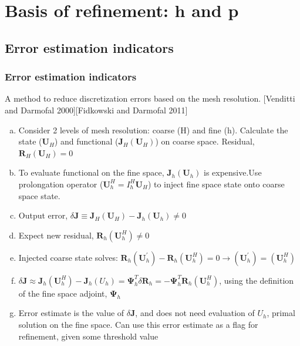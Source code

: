 \documentclass{beamer}
\begin{document}
\section[$\Psi$ with h]{Basis of refinement: h and p}

\subsection[Estimation]{Error estimation indicators}
\begin{frame}
\scriptsize
\frametitle{Error estimation indicators}

A method to reduce discretization errors based on the mesh resolution.
\tiny{[Venditti and Darmofal 2000][Fidkowski and Darmofal 2011]}
\begin{enumerate}[(a)]
\scriptsize
\item Consider 2 levels of mesh resolution: coarse (H) and fine (h). Calculate the state ($\mathbf{U}_H$) and functional ($\mathbf{J}_H(\mathbf{U}_H)$) on coarse space. Residual, $\mathbf{R}_H(\mathbf{U}_H) = 0$
\item To evaluate functional on the fine space, $\mathbf{J}_h(\mathbf{U}_h)$ is expensive.Use prolongation operator ($\mathbf{U}_h^H = I_h^H \mathbf{U}_H$) to inject fine space state onto coarse space state.
\item Output error, $\delta \mathbf{J} \equiv \mathbf{J}_H(\mathbf{U}_H) - \mathbf{J}_h(\mathbf{U}_h) \neq 0$
\item Expect new residual, $\mathbf{R}_h(\mathbf{U}_h^H) \neq 0$ 
\item Injected coarse state solves: $ \mathbf{R}_h(\mathbf{U}_h^\prime) - \mathbf{R}_h(\mathbf{U}_h^H) = 0 \rightarrow (\mathbf{U}_h^\prime) = (\mathbf{U}_h^H)$
\item $ \delta \mathbf{J} \approx  \mathbf{J}_h(\mathbf{U}_h^H) - \mathbf{J}_h(U_h) = \mathbf{\Psi}_h^T \delta \mathbf{R}_h = -\mathbf{\Psi}_h^T \mathbf{R}_h(\mathbf{U}_h^H)   $, using the definition of the fine space adjoint, $\mathbf{\Psi}_h$
\item Error estimate is the value of $\delta \mathbf{J}$, and does not need evaluation of $U_h$, primal solution on the fine space. Can use this error estimate as a flag for refinement, given some threshold value
\end{enumerate}

\end{frame}
\end{document}

